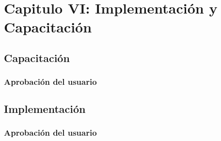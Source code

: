 \chapter{\textbf{Capitulo VI: Implementación y Capacitación}}

\section{Capacitación}
\subsection{Aprobación del usuario}
\section{Implementación}
\subsection{Aprobación del usuario}